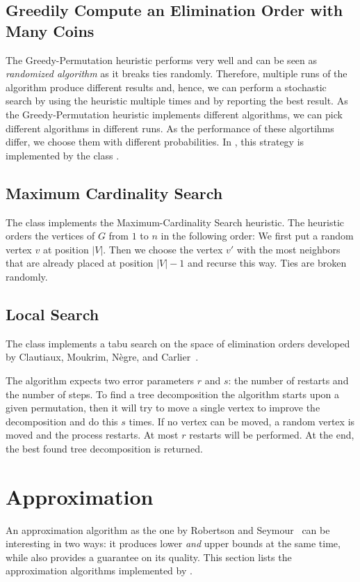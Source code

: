 \documentclass[a4paper, ukenglish, twoside, openright]{jdrasilmanual}
\begin{document}
\section{Greedily Compute an Elimination Order with Many Coins}
The Greedy-Permutation heuristic performs very well and can be seen as
\emph{randomized algorithm} as it breaks ties randomly.  Therefore,
multiple runs of the algorithm produce different results and, hence,
we can perform a stochastic search by using the heuristic multiple
times and by reporting the best result. As the
Greedy-Permutation heuristic implements different algorithms, we can
pick different algorithms in different runs. As the performance of
these algortihms differ, we choose them with different probabilities.
In \Jdrasil{}, this strategy is implemented by the class .

\section{Maximum Cardinality Search}
The class  implements the
Maximum-Cardinality Search heuristic. The heuristic orders the vertices
of $G$ from $1$ to $n$ in the following order: We first put a
random vertex $v$ at position $|V|$. Then we choose the vertex $v'$
with the most neighbors that are already placed at position $|V|-1$
and recurse this way. Ties are broken randomly.

\section{Local Search}
The class  implements a tabu search on
the space of elimination orders developed by Clautiaux, Moukrim,
N{\`e}gre, and Carlier~\cite{clautiaux2004heuristic}.

The algorithm expects two error parameters $r$ and $s$: the number of
restarts and the number of steps.  To find a tree decomposition the
algorithm starts upon a given permutation, then it will try to move a
single vertex to improve the decomposition and do this $s$ times. If
no vertex can be moved, a random vertex is moved and the process
restarts. At most $r$ restarts will be performed.  At the end, the
best found tree decomposition is returned.

\chapter{Approximation}
An approximation algorithm as the one by Robertson and Seymour~\cite{RobertsonS1995} can be interesting in two ways: it
produces lower \emph{and} upper bounds at the same time, while also
provides a guarantee on its quality. This section lists the
approximation algorithms implemented by \Jdrasil.
\end{document}

